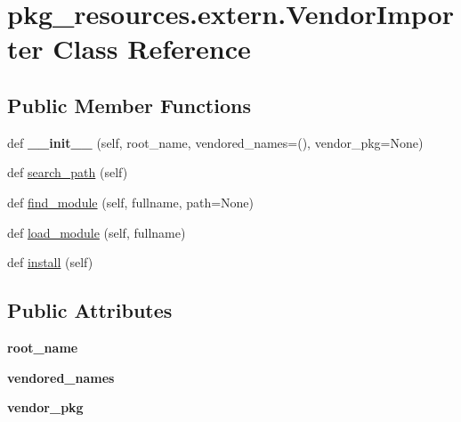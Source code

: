 \hypertarget{classpkg__resources_1_1extern_1_1_vendor_importer}{}\section{pkg\+\_\+resources.\+extern.\+Vendor\+Importer Class Reference}
\label{classpkg__resources_1_1extern_1_1_vendor_importer}
\subsection*{Public Member Functions}
\begin{DoxyCompactItemize}
\item 
\mbox{\label{classpkg__resources_1_1extern_1_1_vendor_importer_a0655efdee333640e2c764753b63db9bf}} 
def {\bfseries \+\_\+\+\_\+init\+\_\+\+\_\+} (self, root\+\_\+name, vendored\+\_\+names=(), vendor\+\_\+pkg=None)
\item 
def \hyperlink{classpkg__resources_1_1extern_1_1_vendor_importer_a52bda559ea3f43c176fc4c50b084c5a8}{search\+\_\+path} (self)
\item 
def \hyperlink{classpkg__resources_1_1extern_1_1_vendor_importer_ab949d2b108d3d3fc6016802475b55148}{find\+\_\+module} (self, fullname, path=None)
\item 
def \hyperlink{classpkg__resources_1_1extern_1_1_vendor_importer_aa34920cbe53734c059a0565d5403aebc}{load\+\_\+module} (self, fullname)
\item 
def \hyperlink{classpkg__resources_1_1extern_1_1_vendor_importer_a94f50109a30bf7e9e5914c8f0f41b7dc}{install} (self)
\end{DoxyCompactItemize}
\subsection*{Public Attributes}
\begin{DoxyCompactItemize}
\item 
\mbox{\label{classpkg__resources_1_1extern_1_1_vendor_importer_aa6dd174ffafaa82d89e9e7783558688e}} 
{\bfseries root\+\_\+name}
\item 
\mbox{\label{classpkg__resources_1_1extern_1_1_vendor_importer_abe2261f2f4d60f73258bec4857aefa27}} 
{\bfseries vendored\+\_\+names}
\item 
\mbox{\label{classpkg__resources_1_1extern_1_1_vendor_importer_a2aa3e3831167177b75341e463bfdbeb6}} 
{\bfseries vendor\+\_\+pkg}
\end{DoxyCompactItemize}


